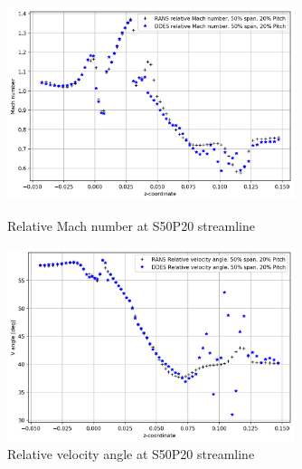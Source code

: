\begin{figure}[ht]
  \centering
  \includegraphics[width=0.75\textwidth]{Pictures/mach-rel-S50-P20.png}
  \caption{Relative Mach number at S50P20 streamline} \label{mach-rel-S50-P20}
  \vspace*{\floatsep}%
  \includegraphics[width=0.75\textwidth]{Pictures/vang-rel-S50-P20.png}
  \caption{Relative velocity angle at S50P20 streamline} \label{vang-rel-S50-P20}
\end{figure}


